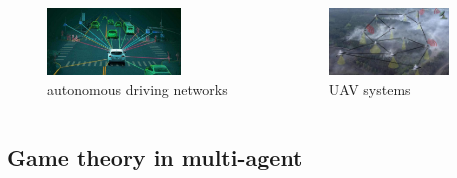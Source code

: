 \begin{frame}
\begin{itemize}
  \begin{columns}[c]
    \column{6cm}
      \begin{figure}
          \includegraphics[height=0.7in]{figure/game/3-autonomus-driving.jpeg}
          \vspace{-6pt}
          \caption{autonomous driving networks}
         \label{fig3}
      \end{figure}
       \column{6cm}
       \begin{figure}
         \includegraphics[height=0.7in]{figure/game/4-UAV-systems.jpeg}
         \vspace{-6pt}
         \caption{UAV systems}
        \label{fig4} 
     \end{figure}
       \end{columns}

  \end{itemize}
\end{frame}

\subsection[Game Theory]{Game theory in multi-agent}\label{subsec:1-2}

